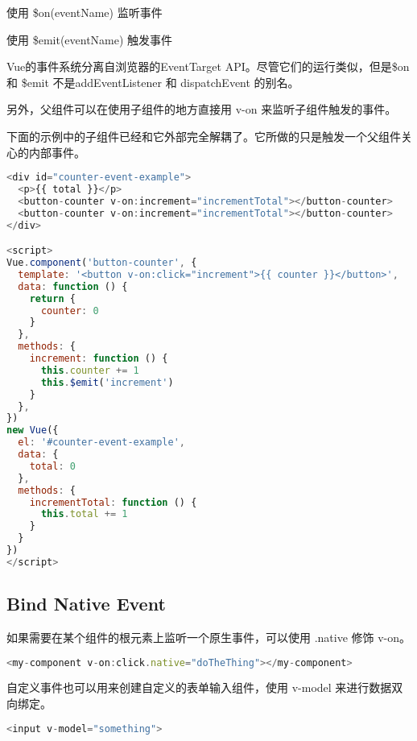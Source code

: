 \begin{compactitem}
\item 使用 \$on(eventName) 监听事件
\item 使用 \$emit(eventName) 触发事件
\end{compactitem}

Vue的事件系统分离自浏览器的EventTarget API。尽管它们的运行类似，但是\$on 和 \$emit 不是addEventListener 和 dispatchEvent 的别名。

另外，父组件可以在使用子组件的地方直接用 v-on 来监听子组件触发的事件。




下面的示例中的子组件已经和它外部完全解耦了。它所做的只是触发一个父组件关心的内部事件。





\begin{lstlisting}[language=JavaScript]
<div id="counter-event-example">
  <p>{{ total }}</p>
  <button-counter v-on:increment="incrementTotal"></button-counter>
  <button-counter v-on:increment="incrementTotal"></button-counter>
</div>

<script>
Vue.component('button-counter', {
  template: '<button v-on:click="increment">{{ counter }}</button>',
  data: function () {
    return {
      counter: 0
    }
  },
  methods: {
    increment: function () {
      this.counter += 1
      this.$emit('increment')
    }
  },
})
new Vue({
  el: '#counter-event-example',
  data: {
    total: 0
  },
  methods: {
    incrementTotal: function () {
      this.total += 1
    }
  }
})
</script>
\end{lstlisting}


\subsection{Bind Native Event}

如果需要在某个组件的根元素上监听一个原生事件，可以使用 .native 修饰 v-on。


\begin{lstlisting}[language=JavaScript]
<my-component v-on:click.native="doTheThing"></my-component>
\end{lstlisting}

自定义事件也可以用来创建自定义的表单输入组件，使用 v-model 来进行数据双向绑定。


\begin{lstlisting}[language=JavaScript]
<input v-model="something">
\end{lstlisting}


